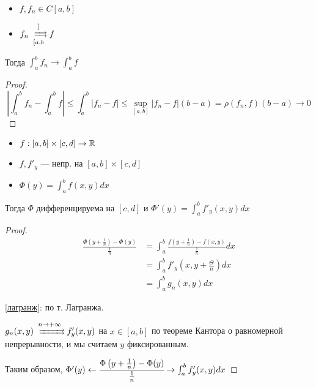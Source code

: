 \begin{manualtheorem}{2}\itemfix
    \begin{itemize}
        \item $f, f_n \in C[a, b]$
        \item $f_n\xrightrightarrows[[a, b]]{} f$
    \end{itemize}
    Тогда $\int_a^b f_n \to \int_a^b f$
\end{manualtheorem}
\begin{proof}
    $$\left|\int_a^b f_n - \int_a^b f\right| \le \int_a^b |f_n - f| \le \sup_{[a, b]} |f_n - f|(b-a) = \rho(f_n, f)(b-a) \to0$$
\end{proof}
\begin{corollary}\itemfix
    \begin{itemize}
        \item $f : [a,b]\times[c, d] \to\mathbb{R}$
        \item $f, f'_y$ --- непр. на $[a, b]\times [c, d]$
        \item $\Phi(y) = \int_a^b f(x, y) dx$
    \end{itemize}
    Тогда $\Phi$ дифференцируема на $[c, d]$ и $\Phi'(y) = \int_a^b f'_y(x, y) dx$
\end{corollary}
\begin{proof}
    \begin{align}
        \frac{\Phi\left(y + \frac{1}{n}\right) - \Phi(y)}{\frac{1}{n}} & = \int_a^b \frac{f\left(y + \frac{1}{n}\right) - f(x, y)}{\frac{1}{n}}dx \\
                                                                       & = \int_a^b f'_y\left(x, y + \frac{\Theta}{n}\right) dx \label{лагранж}   \\
                                                                       & = \int_a^b g_n(x, y) dx
    \end{align}

    \ref{лагранж}: по т. Лагранжа.

    $g_n(x, y) \xrightrightarrows[]{n\to+\infty} f'_y(x, y)$ на $x\in[a, b]$ по теореме Кантора о равномерной непрерывности, и мы считаем $y$ фиксированным.

    Таким образом, $\Phi'(y)\leftarrow\cfrac{\Phi\left(y + \frac{1}{n}\right) - \Phi(y)}{\frac{1}{n}}\rightarrow \int_a^b f'_y(x, y)dx$
\end{proof}

